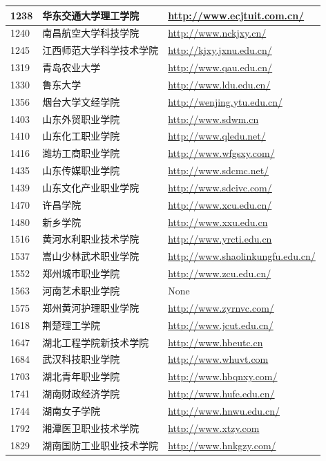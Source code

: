 \documentclass[logo,reportComp]{thesis}
\begin{document}
\begin{longtable}{|l|l|l|}
1238 & 华东交通大学理工学院 & \url{http://www.ecjtuit.com.cn/}\\\hline
1240 & 南昌航空大学科技学院 & \url{http://www.nckjxy.cn/}\\\hline
1245 & 江西师范大学科学技术学院 & \url{http://kjxy.jxnu.edu.cn/}\\\hline
1319 & 青岛农业大学 & \url{http://www.qau.edu.cn/}\\\hline
1330 & 鲁东大学 & \url{http://www.ldu.edu.cn/}\\\hline
1356 & 烟台大学文经学院 & \url{http://wenjing.ytu.edu.cn/}\\\hline
1403 & 山东外贸职业学院 & \url{http://www.sdwm.cn}\\\hline
1410 & 山东化工职业学院 & \url{http://www.qledu.net/}\\\hline
1416 & 潍坊工商职业学院 & \url{http://www.wfgsxy.com/}\\\hline
1435 & 山东传媒职业学院 & \url{http://www.sdcmc.net/}\\\hline
1439 & 山东文化产业职业学院 & \url{http://www.sdcivc.com/}\\\hline
1470 & 许昌学院 & \url{http://www.xcu.edu.cn/}\\\hline
1480 & 新乡学院 & \url{http://www.xxu.edu.cn}\\\hline
1516 & 黄河水利职业技术学院 & \url{http://www.yrcti.edu.cn}\\\hline
1537 & 嵩山少林武术职业学院 & \url{http://www.shaolinkungfu.edu.cn/}\\\hline
1552 & 郑州城市职业学院 & \url{http://www.zcu.edu.cn/}\\\hline
1563 & 河南艺术职业学院 & None\\\hline
1575 & 郑州黄河护理职业学院 & \url{http://www.zyrnvc.com/}\\\hline
1618 & 荆楚理工学院 & \url{http://www.jcut.edu.cn/}\\\hline
1647 & 湖北工程学院新技术学院 & \url{http://www.hbeutc.cn}\\\hline
1684 & 武汉科技职业学院 & \url{http://www.whuvt.com}\\\hline
1703 & 湖北青年职业学院 & \url{http://www.hbqnxy.com/}\\\hline
1741 & 湖南财政经济学院 & \url{http://www.hufe.edu.cn/}\\\hline
1744 & 湖南女子学院 & \url{http://www.hnwu.edu.cn/}\\\hline
1792 & 湘潭医卫职业技术学院 & \url{http://www.xtzy.com}\\\hline
1829 & 湖南国防工业职业技术学院 & \url{http://www.hnkgzy.com/}\\\hline

\end{longtable}
\end{document}
